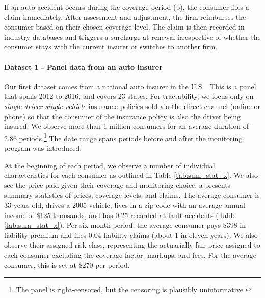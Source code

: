 If an auto accident occurs during the coverage period (b), the consumer files a claim immediately. After assessment and adjustment, the firm reimburses the consumer based on their chosen coverage level. The claim is then recorded in industry databases and triggers a surcharge at renewal irrespective of whether the consumer stays with the current insurer or switches to another firm.

\paragraph{Dataset 1 - Panel data from an auto insurer}

Our first dataset comes from a national auto insurer in the U.S.~\parencite{autoinsurerpanel} This is a panel that spans 2012 to 2016, and covers 23 states. For tractability, we focus only on \emph{single-driver-single-vehicle} insurance policies sold via the direct channel (online or phone) so that the consumer of the insurance policy is also the driver being insured. We observe more than 1 million consumers for an average duration of 2.86 periods.\footnote{The panel is right-censored, but the censoring is plausibly uninformative.} The date range spans periods before and after the monitoring program was introduced.

At the beginning of each period, we observe a number of individual characteristics for each consumer as outlined in Table \ref{tab:sum_stat_x}.
We also see the price paid given their coverage and monitoring choice.
a presents summary statistics of prices, coverage levels, and claims. The average consumer is 33 years old, drives a 2005 vehicle, lives in a zip code with an average annual income of \$125 thousands, and has 0.25 recorded at-fault accidents (Table \ref{tab:sum_stat_x}). Per six-month period, the average consumer pays \$398 in liability premium and files 0.04 liability claims (about 1 in eleven years). We also observe their assigned risk class, representing the actuarially-fair price assigned to each consumer excluding the coverage factor, markups, and fees. For the average consumer, this is set at \$270 per period.



